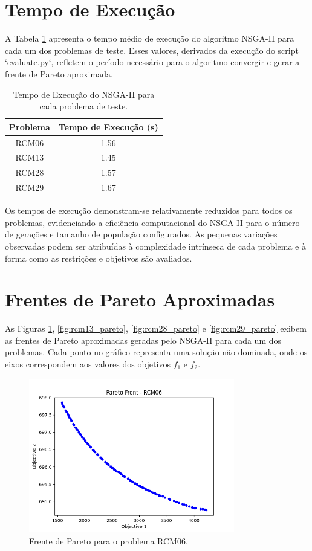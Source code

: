 \documentclass[12pt,openright,oneside,a4paper,english,brazil]{abntex2}
\begin{document}
\section{Tempo de Execução}
A Tabela \ref{tab:execution_time} apresenta o tempo médio de execução do algoritmo NSGA-II para cada um dos problemas de teste. Esses valores, derivados da execução do script `evaluate.py`, refletem o período necessário para o algoritmo convergir e gerar a frente de Pareto aproximada.

\begin{table}[h!]
    \centering
    \caption{Tempo de Execução do NSGA-II para cada problema de teste.}
    \label{tab:execution_time}
    \begin{tabular}{|c|c|}
        \hline
        \textbf{Problema} & \textbf{Tempo de Execução (s)} \\
        \hline
        RCM06 & 1.56 \\
        RCM13 & 1.45 \\
        RCM28 & 1.57 \\
        RCM29 & 1.67 \\
        \hline
    \end{tabular}
\end{table}

Os tempos de execução demonstram-se relativamente reduzidos para todos os problemas, evidenciando a eficiência computacional do NSGA-II para o número de gerações e tamanho de população configurados. As pequenas variações observadas podem ser atribuídas à complexidade intrínseca de cada problema e à forma como as restrições e objetivos são avaliados.

\section{Frentes de Pareto Aproximadas}
As Figuras \ref{fig:rcm06_pareto}, \ref{fig:rcm13_pareto}, \ref{fig:rcm28_pareto} e \ref{fig:rcm29_pareto} exibem as frentes de Pareto aproximadas geradas pelo NSGA-II para cada um dos problemas. Cada ponto no gráfico representa uma solução não-dominada, onde os eixos correspondem aos valores dos objetivos $f_1$ e $f_2$.

\begin{figure}[h!]
    \centering
    \includegraphics[width=0.8\textwidth]{results/RCM06.png}
    \caption{Frente de Pareto para o problema RCM06.}
    \label{fig:rcm06_pareto}
\end{figure}
\end{document}
